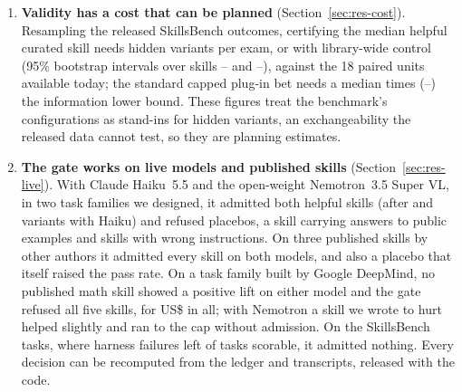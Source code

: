 \begin{enumerate}
\item \textbf{Validity has a cost that can be planned} (Section~\ref{sec:res-cost}). Resampling the released SkillsBench outcomes, certifying the median helpful curated skill needs \NSbMedNAlpha{} hidden variants per exam, or \NSbMedNBonf{} with library-wide control (95\% bootstrap intervals over skills \NSbMedNAlphaLo--\NSbMedNAlphaHi{} and \NSbMedNBonfLo--\NSbMedNBonfHi), against the 18 paired units available today; the standard capped plug-in bet needs a median \NThPrplRatio{} times (\NThPrplRatioLo--\NThPrplRatioHi) the information lower bound. These figures treat the benchmark's configurations as stand-ins for hidden variants, an exchangeability the released data cannot test, so they are planning estimates.
\item \textbf{The gate works on live models and published skills} (Section~\ref{sec:res-live}). With Claude Haiku~5.5 and the open-weight Nemotron~3.5 Super VL, in two task families we designed, it admitted both helpful skills (after \NLsHelpN{} and \NLsBHelpN{} variants with Haiku) and refused placebos, a skill carrying answers to public examples and skills with wrong instructions. On three published skills by other authors it admitted every skill on both models, and also a placebo that itself raised the pass rate. On a task family built by Google DeepMind, no published math skill showed a positive lift on either model and the gate refused all five skills, for US\$\NLFiveTotalCost{} in all; with Nemotron a skill we wrote to hurt helped slightly and ran to the cap without admission. On the SkillsBench tasks, where harness failures left \NLoScored{} of \NLoTasks{} tasks scorable, it admitted nothing. Every decision can be recomputed from the ledger and transcripts, released with the code.
\end{enumerate}

